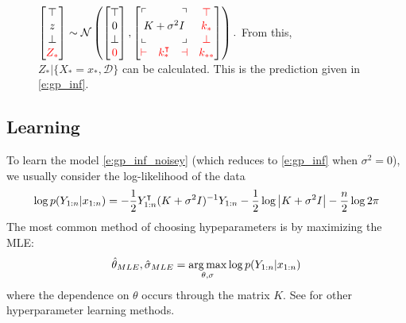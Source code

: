 \begin{figure}[h]
\begin{minipage}[t]{.45\textwidth}
{$ \begin{bmatrix} \top \\ z \\ \bot \\ \textcolor{red}{Z_*} \end{bmatrix} 
\sim \N\left(\begin{bmatrix} \top \\ 0 \\ \bot \\ \textcolor{red}{0} \end{bmatrix}, \begin{bmatrix} \ulcorner &  & \urcorner & \textcolor{red}{\top} \\  \multicolumn{3}{c}{K+\sigma^2 I}   & \textcolor{red}{k_*} \\ \llcorner &  & \lrcorner &  \textcolor{red}{\bot} \\ \textcolor{red}{\vdash} & \textcolor{red}{k_{*}^\tr} & \textcolor{red}{\dashv} &  \textcolor{red}{k_{**}} \end{bmatrix} \right).$
From this, $Z_*|\{X_*=x_*, \mathcal{D}\}$ can be calculated.  This is the prediction given in \eqref{e:gp_inf}.
}
\end{minipage}
\end{figure}

\subsection{Learning}
To learn the model \eqref{e:gp_inf_noisey} (which reduces to \eqref{e:gp_inf} when $\sigma^2=0$), we usually consider the log-likelihood of the data
\begin{equation}
    \log p(Y_{1:n}|x_{1:n}) = -\frac{1}{2} Y_{1:n}^\intercal (K+\sigma^2 I)^{-1} Y_{1:n} - \frac{1}{2} \log\left\lvert K + \sigma^2 I\right\rvert - \frac{n}{2} \log 2\pi
\end{equation}
The most common method of choosing hypeparameters is by maximizing the MLE:
\begin{equation}
    \hat\theta_{MLE}, \hat\sigma_{MLE} = \operatorname*{\arg\max}_{\theta,\sigma} \log p(Y_{1:n}|x_{1:n})
\end{equation}
where the dependence on $\theta$ occurs through the matrix $K$.  See \cite{Ras06} for other hyperparameter learning methods.

